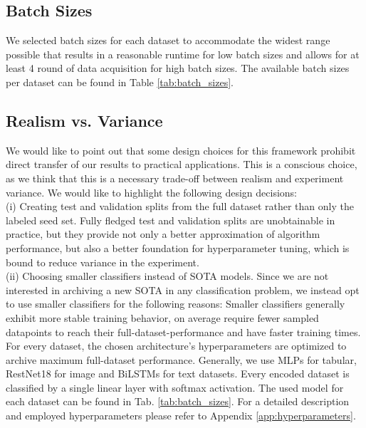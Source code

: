 \documentclass[]{article}
\begin{document}
\subsection{Batch Sizes}\label{sec:batch_sizes}
We selected batch sizes for each dataset to accommodate the widest range possible that results in a reasonable runtime for low batch sizes and allows for at least 4 round of data acquisition for high batch sizes.
The available batch sizes per dataset can be found in Table \ref{tab:batch_sizes}.

\subsection{Realism vs. Variance}\label{sec:realism}
We would like to point out that some design choices for this framework prohibit direct transfer of our results to practical applications. 
This is a conscious choice, as we think that this is a necessary trade-off between realism and experiment variance.
We would like to highlight the following design decisions: \\
(i) Creating test and validation splits from the full dataset rather than only the labeled seed set. Fully fledged test and validation splits are unobtainable in practice, but they provide not only a better approximation of algorithm performance, but also a better foundation for hyperparameter tuning, which is bound to reduce variance in the experiment. \\
(ii) Choosing smaller classifiers instead of SOTA models. Since we are not interested in archiving a new SOTA in any classification problem, we instead opt to use smaller classifiers for the following reasons:
Smaller classifiers generally exhibit more stable training behavior, on average require fewer sampled datapoints to reach their full-dataset-performance and have faster training times.
For every dataset, the chosen architecture's hyperparameters are optimized to archive maximum full-dataset performance.
Generally, we use MLPs for tabular, RestNet18 for image and BiLSTMs for text datasets.
Every encoded dataset is classified by a single linear layer with softmax activation.
The used model for each dataset can be found in Tab. \ref{tab:batch_sizes}.
For a detailed description and employed hyperparameters please refer to Appendix \ref{app:hyperparameters}. 


\end{document}
